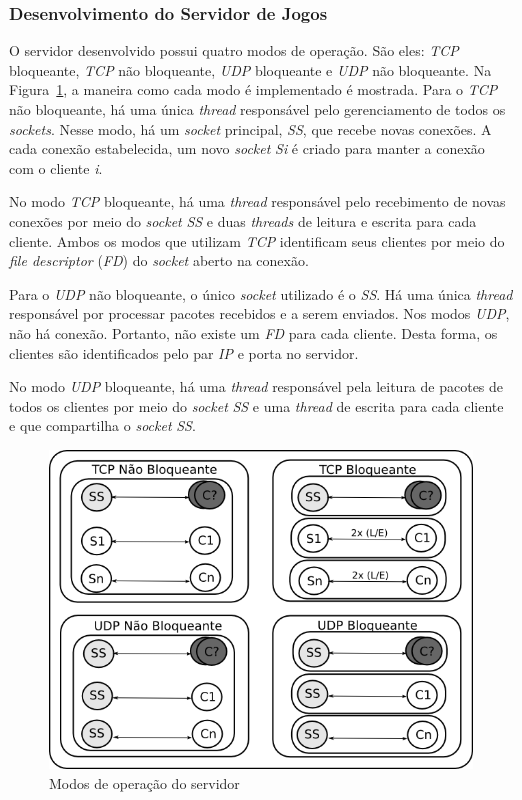 \documentclass[12pt]{article}
\begin{document}
\subsubsection{Desenvolvimento do Servidor de Jogos}

O servidor desenvolvido possui quatro modos de operação. São eles: \emph{TCP}
bloqueante, \emph{TCP} não bloqueante, \emph{UDP} bloqueante e \emph{UDP} não
bloqueante. Na Figura~\ref{fig:server}, a maneira como cada modo é implementado
é mostrada. Para o \emph{TCP} não bloqueante, há uma única \emph{thread}
responsável pelo gerenciamento de todos os \emph{sockets}. Nesse modo, há um
\emph{socket} principal, \emph{SS}, que recebe novas conexões. A cada conexão
estabelecida, um novo \emph{socket} \emph{Si} é criado para manter a conexão
com o cliente \emph{i}.

No modo \emph{TCP} bloqueante, há uma \emph{thread} responsável pelo
recebimento de novas conexões por meio do \emph{socket} \emph{SS} e duas
\emph{threads} de leitura e escrita para cada cliente. Ambos os modos que
utilizam \emph{TCP} identificam seus clientes por meio do \emph{file
descriptor} (\emph{FD}) do \emph{socket} aberto na conexão. 

Para o \emph{UDP} não bloqueante, o único \emph{socket} utilizado é o \emph{SS}. Há uma única \emph{thread} responsável por processar pacotes recebidos e a serem enviados. Nos modos \emph{UDP}, não há conexão. Portanto, não existe um \emph{FD} para
cada cliente. Desta forma, os clientes são identificados pelo par \emph{IP} e
porta no servidor. 

No modo \emph{UDP} bloqueante, há uma \emph{thread}
responsável pela leitura de pacotes de todos os clientes por meio do
\emph{socket} \emph{SS} e uma \emph{thread} de escrita para cada cliente e que
compartilha o \emph{socket} \emph{SS}. 

\begin{figure}[ht]
  \centering
  \includegraphics[width=.8\textwidth]{img/server.png}
  \caption{Modos de operação do servidor}
  \label{fig:server}
\end{figure}
\end{document}
